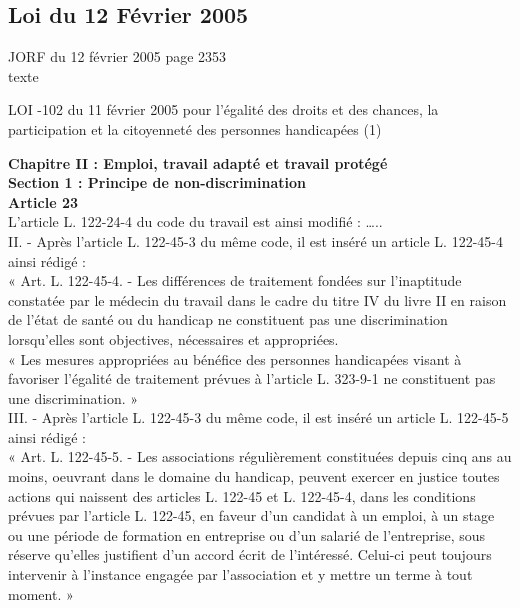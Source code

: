 \subsection{Loi du 12 Février 2005}

\begin{center}
JORF  du 12 février 2005 page 2353\\
texte 
\end{center}

\begin{center}
LOI -102 du 11 février 2005 pour l'égalité des droits et des chances, la participation et la citoyenneté des personnes handicapées (1)\\
\end{center}


\textbf{Chapitre II : Emploi, travail adapté et travail protégé}\\

\textbf{Section 1 : Principe de non-discrimination}\\

\textbf{Article 23}\\

L'article L. 122-24-4 du code du travail est ainsi modifié :
…..\\

II. - Après l'article L. 122-45-3 du même code, il est inséré un article L. 122-45-4 ainsi rédigé :\\
« Art. L. 122-45-4. - Les différences de traitement fondées sur l'inaptitude constatée par le médecin du travail dans le cadre du titre IV du livre II en raison de l'état de santé ou du handicap ne constituent pas une discrimination lorsqu'elles sont objectives, nécessaires et appropriées.\\
« Les mesures appropriées au bénéfice des personnes handicapées visant à favoriser l'égalité de traitement prévues à l'article L. 323-9-1 ne constituent pas une discrimination. »\\

III. - Après l'article L. 122-45-3 du même code, il est inséré un article L. 122-45-5 ainsi rédigé :\\
« Art. L. 122-45-5. - Les associations régulièrement constituées depuis cinq ans au moins, oeuvrant dans le domaine du handicap, peuvent exercer en justice toutes actions qui naissent des articles L. 122-45 et L. 122-45-4, dans les conditions prévues par l'article L. 122-45, en faveur d'un candidat à un emploi, à un stage ou une période de formation en entreprise ou d'un salarié de l'entreprise, sous réserve qu'elles justifient d'un accord écrit de l'intéressé. Celui-ci peut toujours intervenir à l'instance engagée par l'association et y mettre un terme à tout moment. »\\

